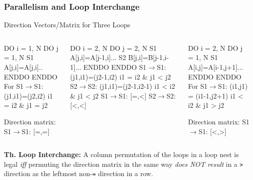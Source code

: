 \documentclass{beamer}
\newcommand{\emp}[1]{\textcolor{DikuRed}{ #1}}
\newcommand{\mymath}[1]{$ #1 $}
\begin{document}
\begin{frame}[fragile,t]
  \frametitle{Parallelism and Loop Interchange} %

\begin{block}{Direction Vectors/Matrix for Three Loops }
\begin{columns}
\begin{colorcode}
  DO i = 1, N
    DO j = 1, N
S1    A[j,i]=A[j,i]..
    ENDDO
  ENDDO
For S1\mymath{\rightarrow}S1: 
    (j1,i1)=(j2,i2) 
    i1 \emp{=} i2 \& j1 \emp{=} j2

Direction matrix:
S1\mymath{\rightarrow}S1: \emp{[=,=]}
\end{colorcode}
\begin{colorcode}
  DO i = 2, N
    DO j = 2, N
S1    A[j,i]=A[j-1,i]...
S2    B[j,i]=B[j-1,i-1]...
    ENDDO
  ENDDO
S1\mymath{\rightarrow}S1: (j1,i1)=(j2-1,i2)
        i1 \emp{=} i2 \& j1 \emp{<} j2
S2\mymath{\rightarrow}S2: (j1,i1)=(j2-1,i2-1)
        i1 \emp{<} i2 \& j1 \emp{<} j2
S1\mymath{\rightarrow}S1: \emp{[=,<]}
S2\mymath{\rightarrow}S2: \emp{[<,<]}
\end{colorcode}
\begin{colorcode}
  DO i = 2, N
    DO j = 1, N
S1    A[i,j]=A[i-1,j+1]...
    ENDDO
  ENDDO
For S1\mymath{\rightarrow}S1: 
    (i1,j1) = (i1-1,j2+1)
    i1 \emp{<} i2 \& j1 \emp{>} j2

Direction matrix:
S1\mymath{\rightarrow}S1: \emp{[<,>]}
\end{colorcode}
\end{columns}
\end{block} 

{\bf Th. Loop Interchange:} A column permutation of the loops in a loop nest 
is legal {\em iff} permuting the direction matrix in the same way {\em does NOT result}
in a {\tt >} direction as the leftmost non-{\tt{}=} direction in a row. 

\end{frame}
\end{document}

